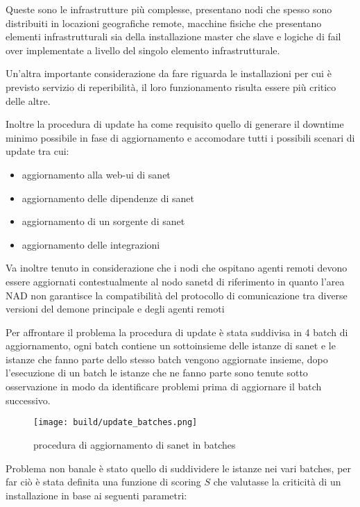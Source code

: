 Queste sono le infrastrutture più complesse, presentano nodi che spesso sono distribuiti in locazioni geografiche remote, macchine fisiche che presentano elementi infrastrutturali sia della installazione master che slave e logiche di fail over implementate a livello del singolo elemento infrastrutturale.

Un'altra importante considerazione da fare riguarda le installazioni per cui è previsto servizio di reperibilità, il loro funzionamento risulta essere più critico delle altre.

Inoltre la procedura di update ha come requisito quello di generare il downtime minimo possibile in fase di aggiornamento e accomodare tutti i possibili scenari di update tra cui:

\begin{itemize}
  \item{aggiornamento alla web-ui di sanet}
  \item{aggiornamento delle dipendenze di sanet}
  \item{aggiornamento di un sorgente di sanet}
  \item{aggiornamento delle integrazioni}
\end{itemize}

Va inoltre tenuto in considerazione che i nodi che ospitano agenti remoti devono essere aggiornati contestualmente al nodo sanetd di riferimento in quanto l'area NAD non garantisce la compatibilità del protocollo di comunicazione tra diverse versioni del demone principale e degli agenti remoti

Per affrontare il problema la procedura di update è stata suddivisa in 4 batch di aggiornamento, ogni batch contiene un sottoinsieme delle istanze di sanet e le istanze che fanno parte dello stesso batch vengono aggiornate insieme, dopo l'esecuzione di un batch le istanze che ne fanno parte sono tenute sotto osservazione in modo da identificare problemi prima di aggiornare il batch successivo.

\begin{figure}[H]
    \centering
    \texttt{[image: build/update\_batches.png]}
    \caption{procedura di aggiornamento di sanet in batches}
    \label{fig:update_batches}
\end{figure}

Problema non banale è stato quello di suddividere le istanze nei vari batches, per far ciò è stata definita una funzione di scoring \(S\) che valutasse la criticità di un installazione in base ai seguenti parametri:

